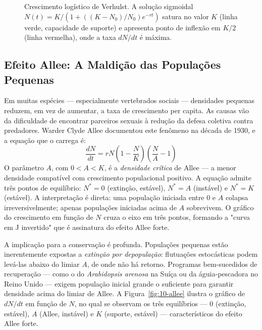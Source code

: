 \begin{figure}[htbp]
\centering
{}
\caption{Crescimento logístico de Verhulst. A solução sigmoidal $N(t) = K/(1 + ((K-N_0)/N_0) e^{-rt})$ satura no valor $K$ (linha verde, capacidade de suporte) e apresenta ponto de inflexão em $K/2$ (linha vermelha), onde a taxa $dN/dt$ é máxima.}
\label{fig:10-logistico}
\end{figure}

\subsection{Efeito Allee: A Maldição das Populações Pequenas}
\label{sub:image10-allee}

Em muitas espécies --- especialmente vertebrados sociais --- densidades
pequenas reduzem, em vez de aumentar, a taxa de crescimento per capita. As
causas vão da dificuldade de encontrar parceiros sexuais à redução da defesa
coletiva contra predadores. Warder Clyde Allee documentou este fenômeno na
década de 1930, e a equação que o carrega é:
\begin{equation}
\frac{dN}{dt} = r N \left(1 - \frac{N}{K}\right) \left(\frac{N}{A} - 1\right)
\end{equation}
O parâmetro $A$, com $0 < A < K$, é a \emph{densidade crítica} de Allee --- a
menor densidade compatível com crescimento populacional positivo. A equação
admite três pontos de equilíbrio: $N^* = 0$ (extinção, estável), $N^* = A$
(instável) e $N^* = K$ (estável). A interpretação é direta: uma população
iniciada entre $0$ e $A$ colapsa irreversivelmente; apenas populações
iniciadas acima de $A$ sobrevivem. O gráfico do crescimento em função de $N$
cruza o eixo em três pontos, formando a "curva em J invertido" que é assinatura
do efeito Allee forte.

A implicação para a conservação é profunda. Populações pequenas estão
inerentemente expostas a \emph{extinção por depopulação}: flutuações
estocásticas podem levá-las abaixo do limiar $A$, de onde não há retorno.
Programas bem-sucedidos de recuperação --- como o do \textit{Arabidopsis
arenosa} na Suíça ou da águia-pescadora no Reino Unido --- exigem população
inicial grande o suficiente para garantir densidade acima do limiar de Allee.
A Figura~\ref{fig:10-allee} ilustra o gráfico de $dN/dt$ em função de $N$, no
qual se observam os três equilíbrios --- $0$ (extinção, estável), $A$ (Allee,
instável) e $K$ (suporte, estável) --- característicos do efeito Allee forte.

